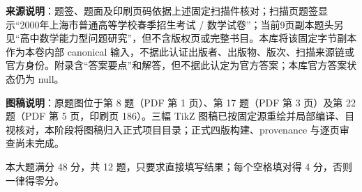 


\begin{gktip}
\textbf{来源说明}：题签、题面及印刷页码依据上述固定扫描件核对；扫描页题签显示“2000年上海市普通高等学校春季招生考试 / 数学试卷”；当前9页副本题头另见“高中数学能力型问题研究”，但不含版权页或完整书目。本库将该固定字节副本作为本卷内部 canonical 输入，不据此认证出版者、出版物、版次、扫描来源链或官方身份。附录含“答案要点”和解答，但不据此认定为官方答案；本库官方答案状态仍为 null。

\textbf{图稿说明}：原题图位于第 8 题（PDF 第 1 页）、第 17 题（PDF 第 3 页）及第 22 题（PDF 第 5 页，印刷页 186）。三幅 TikZ 图稿已按固定源重绘并局部编译、目视核对，本阶段将图稿归入正式项目目录；正式四版构建、provenance 与逐页审查尚未完成。
\end{gktip}


本大题满分 48 分，共 12 题，只要求直接填写结果；每个空格填对得 4 分，否则一律得零分。

